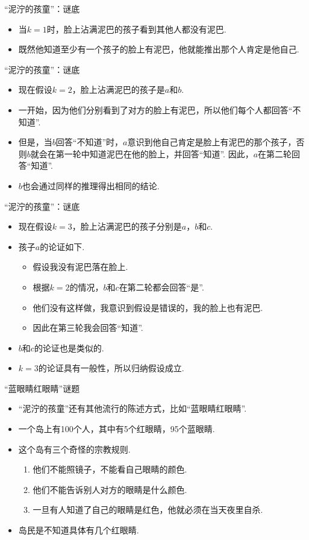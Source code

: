 {“泥泞的孩童”：谜底}
\begin{itemize}
    \item 当$k=1$时，脸上沾满泥巴的孩子看到其他人都没有泥巴. 
    \item 既然他知道至少有一个孩子的脸上有泥巴，他就能推出那个人肯定是他自己. 
\end{itemize}



{“泥泞的孩童”：谜底}
\begin{itemize}
    \item 现在假设$k=2$，脸上沾满泥巴的孩子是$a$和$b$. 
    \item 一开始，因为他们分别看到了对方的脸上有泥巴，所以他们每个人都回答“不知道”. 
    \item 但是，当$b$回答“不知道”时，$a$意识到他自己肯定是脸上有泥巴的那个孩子，否则$b$就会在第一轮中知道泥巴在他的脸上，并回答“知道”. 因此，$a$在第二轮回答“知道”. 
    \item $b$也会通过同样的推理得出相同的结论. 
\end{itemize}


{“泥泞的孩童”：谜底}
\begin{itemize}
    \item 现在假设$k=3$，脸上沾满泥巴的孩子分别是$a$，$b$和$c$. 
    \item 孩子$a$的论证如下. 
    \begin{itemize}
        \item 假设我没有泥巴落在脸上. 
        \item 根据$k=2$的情况，$b$和$c$在第二轮都会回答“是”. 
        \item 他们没有这样做，我意识到假设是错误的，我的脸上也有泥巴.
        \item 因此在第三轮我会回答“知道”. 
    \end{itemize}
    \item $b$和$c$的论证也是类似的.
    \item $k=3$的论证具有一般性，所以归纳假设成立.
\end{itemize}


{“蓝眼睛红眼睛”谜题}
\begin{itemize}
    \item “泥泞的孩童”还有其他流行的陈述方式，比如“蓝眼睛红眼睛”.
    \item 一个岛上有100个人，其中有5个红眼睛，95个蓝眼睛.
    \item 这个岛有三个奇怪的宗教规则.
    \begin{enumerate}
        \item 他们不能照镜子，不能看自己眼睛的颜色. 
        \item 他们不能告诉别人对方的眼睛是什么颜色. 
        \item 一旦有人知道了自己的眼睛是红色，他就必须在当天夜里自杀.
    \end{enumerate}
    \item 岛民是不知道具体有几个红眼睛. 
\end{itemize}


